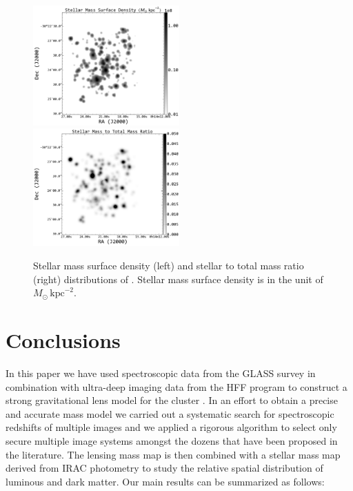 \begin{figure}[ht]
    \includegraphics[width=0.5\textwidth]{fig/a2744_clmember_smass_map_kpc2.pdf}
    \includegraphics[width=0.5\textwidth]{fig/total_stellar_mass_ratio_A2744.pdf}
    \caption[Stellar mass surface density and stellar to total mass ratio.]{Stellar mass surface density (left) and stellar to total mass ratio (right) distributions of \cler.
    Stellar mass surface density is in the unit of $M_\odot\,\text{kpc}^{-2}$.  \label{fig:stellarMassMap}}
\end{figure} 
\vspace{1cm}

\section{Conclusions}
\label{sec:conc}

In this paper we have used spectroscopic data from the GLASS survey in
combination with ultra-deep imaging data from the HFF program to
construct a strong gravitational lens model for the cluster \cler. In an
effort to obtain a precise and accurate mass model we carried out a
systematic search for spectroscopic redshifts of multiple images and
we applied a rigorous algorithm to select only secure multiple image
systems amongst the dozens that have been proposed in the
literature. The lensing mass map is then combined with a stellar
mass map derived from IRAC photometry to study the relative spatial
distribution of luminous and dark matter.  Our main results can be
summarized as follows:

